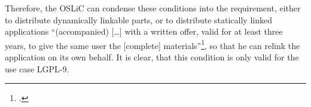 \begin{itemize}
  Therefore, the OSLiC can condense these conditions into the requirement,
  either to distribute dynamically linkable parts, or to distribute statically
  linked applications \enquote{(accompanied) [\ldots] with a written offer,
  valid for at least three years, to give the same user the [complete]
  materials}\footcite[cf.][\nopage wp.\ §6]{Lgpl21OsiLicense1999a}, so that he
  can relink the application on its own behalf. It is clear, that this condition
  is only valid for the use case LGPL-9.
  
\end{itemize}





%
